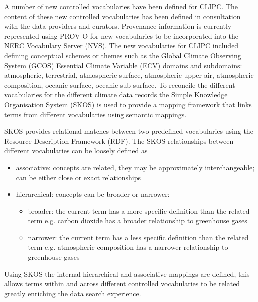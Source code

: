 \documentclass[final,1p,times,twocolumn,authoryear]{elsarticle}
\begin{document}
{{%

A number of new controlled vocabularies have been defined for CLIPC. The content of these new controlled vocabularies has been defined in consultation with the data providers and curators. Provenance information is currently represented using PROV-O for new vocabularies to be incorporated into the NERC Vocabulary Server (NVS). The new vocabularies for CLIPC included defining conceptual schemes or themes such as the Global Climate Observing System (GCOS) Essential Climate Variable (ECV) domains and subdomains: atmospheric, terrestrial, atmospheric surface, atmospheric upper-air, atmospheric composition, oceanic surface, oceanic sub-surface. To reconcile the different vocabularies for the different climate data records the Simple Knowledge Organisation System (SKOS) is used to provide a mapping framework that links terms from different vocabularies using semantic mappings. 

SKOS provides relational matches between two predefined vocabularies using the Resource Description Framework (RDF). The SKOS relationships between different vocabularies can be loosely defined as 

\begin{itemize}
    \item associative: concepts are related, they may be approximately interchangeable; can be either close or exact relationships
    \item hierarchical: concepts can be broader or narrower:
        \begin{itemize}
            \item broader: the current term has a more specific definition than the related term e.g. carbon dioxide has a broader relationship to greenhouse gases
            \item narrower: the current term has a less specific definition than the related term e.g. atmospheric composition has a narrower relationship to greenhouse gases
        \end{itemize}
\end{itemize}

Using SKOS the internal hierarchical and associative mappings are defined, this allows terms within and across different controlled vocabularies to be related greatly enriching the data search experience. 

}}
\end{document}
